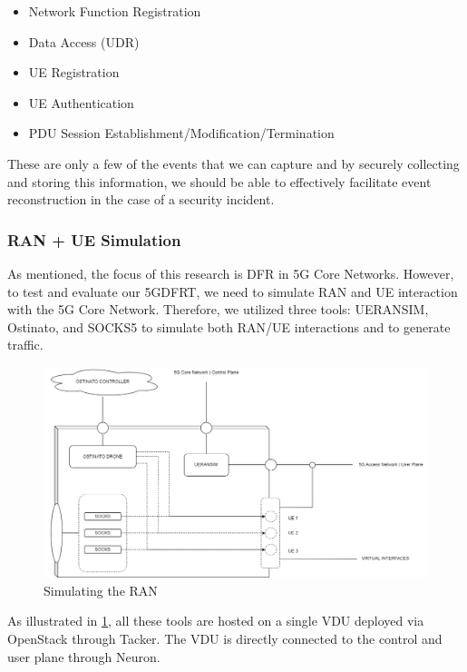 \documentclass[final,1p,times,authoryear]{elsarticle}
\begin{document}
\begin{itemize}
	\item Network Function Registration
	\item Data Access (UDR)
	\item UE Registration
	\item UE Authentication
	\item PDU Session Establishment/Modification/Termination
\end{itemize}

These are only a few of the events that we can capture and by securely collecting and storing this information, we should be able to effectively facilitate event reconstruction in the case of a security incident.

\subsubsection{RAN + UE Simulation}
\label{sub3sub6sec3}
As mentioned, the focus of this research is DFR in 5G Core Networks. However, to test and evaluate our 5GDFRT, we need to simulate RAN and UE interaction with the 5G Core Network. Therefore, we utilized three tools: UERANSIM, Ostinato, and SOCKS5 to simulate both RAN/UE interactions and to generate traffic.

\begin{figure}[H]
  \centering
  \includegraphics[width=\textwidth, height=\textheight, keepaspectratio]{diagrams/UERANSIM_Ostinato_SOCKS.png}
  \caption{Simulating the RAN}
  \label{fig:sim_ran}
\end{figure}

As illustrated in \ref{fig:sim_ran}, all these tools are hosted on a single VDU deployed via OpenStack through Tacker. The VDU is directly connected to the control and user plane through Neuron.
\end{document}
